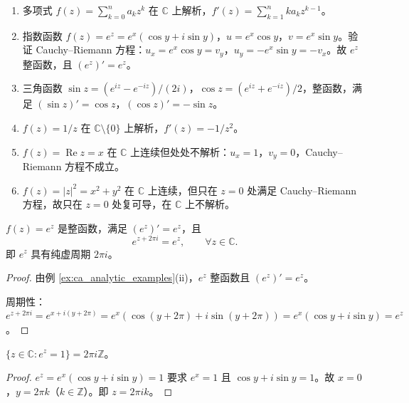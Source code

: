 \begin{example}[解析函数的实例]\label{ex:ca_analytic_examples}
\begin{enumerate}[label=(\roman*)]
    \item 多项式 $f(z) = \sum_{k=0}^{n} a_k z^k$ 在 $\mathbb{C}$ 上解析，$f'(z) = \sum_{k=1}^{n} k a_k z^{k-1}$。
    \item 指数函数 $f(z) = e^z = e^x(\cos y + i \sin y)$，$u = e^x \cos y$，$v = e^x \sin y$。验证 Cauchy--Riemann 方程：$u_x = e^x \cos y = v_y$，$u_y = -e^x \sin y = -v_x$。故 $e^z$ 整函数，且 $(e^z)' = e^z$。
    \item 三角函数 $\sin z = (e^{iz} - e^{-iz})/(2i)$，$\cos z = (e^{iz} + e^{-iz})/2$，整函数，满足 $(\sin z)' = \cos z$，$(\cos z)' = -\sin z$。
    \item $f(z) = 1/z$ 在 $\mathbb{C} \setminus \{0\}$ 上解析，$f'(z) = -1/z^2$。
    \item $f(z) = \operatorname{Re} z = x$ 在 $\mathbb{C}$ 上连续但处处不解析：$u_x = 1$，$v_y = 0$，Cauchy--Riemann 方程不成立。
    \item $f(z) = |z|^2 = x^2 + y^2$ 在 $\mathbb{C}$ 上连续，但只在 $z = 0$ 处满足 Cauchy--Riemann 方程，故只在 $z=0$ 处复可导，在 $\mathbb{C}$ 上不解析。
\end{enumerate}
\end{example}

\begin{theorem}[复指数函数的周期性与导数]\label{thm:ca_exp_periodicity}
$f(z) = e^z$ 是整函数，满足 $(e^z)' = e^z$，且
\[
e^{z + 2\pi i} = e^z, \qquad \forall z \in \mathbb{C}.
\]
即 $e^z$ 具有纯虚周期 $2\pi i$。
\end{theorem}

\begin{proof}
由例 \ref{ex:ca_analytic_examples}(ii)，$e^z$ 整函数且 $(e^z)' = e^z$。

周期性：$e^{z + 2\pi i} = e^{x + i(y + 2\pi)} = e^x(\cos(y + 2\pi) + i \sin(y + 2\pi)) = e^x(\cos y + i \sin y) = e^z$。
\end{proof}

\begin{corollary}[复指数函数的核]\label{cor:ca_exp_kernel}
$\{z \in \mathbb{C} : e^z = 1\} = 2\pi i \mathbb{Z}$。
\end{corollary}

\begin{proof}
$e^z = e^x(\cos y + i \sin y) = 1$ 要求 $e^x = 1$ 且 $\cos y + i \sin y = 1$。故 $x = 0$，$y = 2\pi k$（$k \in \mathbb{Z}$）。即 $z = 2\pi i k$。
\end{proof}

